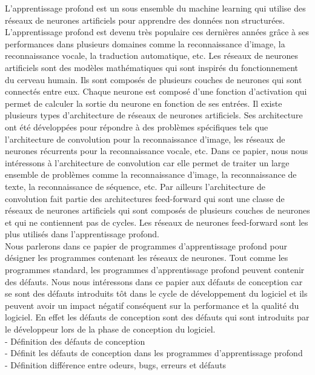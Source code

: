 \label{sec:introduction}

L'apprentissage profond est un sous ensemble du machine learning qui utilise des
réseaux de neurones artificiels pour apprendre des données non structurées.
L'apprentissage profond est devenu très populaire ces dernières années grâce à
ses performances dans plusieurs domaines comme la reconnaissance d'image, la
reconnaissance vocale, la traduction automatique, etc. Les réseaux de neurones
artificiels sont des modèles mathématiques qui sont inspirés du fonctionnement
du cerveau humain. Ils sont composés de plusieurs couches de neurones qui sont
connectés entre eux. Chaque neurone est composé d'une fonction d'activation qui
permet de calculer la sortie du neurone en fonction de ses entrées. Il existe
plusieurs types d'architecture de réseaux de neurones artificiels. Ses
architecture ont été développées pour répondre à des problèmes spécifiques tels
que l'architecture de convolution pour la reconnaissance d'image, les réseaux de
neurones récurrents pour la reconnaissance vocale, etc. Dans ce papier, nous
nous intéressons à l'architecture de convolution car elle permet de traiter un
large ensemble de problèmes comme la reconnaissance d'image, la reconnaissance
de texte, la reconnaissance de séquence, etc. Par ailleurs l'architecture de
convolution fait partie des architectures feed-forward qui sont une classe de
réseaux de neurones artificiels qui sont composés de plusieurs couches de
neurones  et qui ne contiennent pas de cycles. Les réseaux de neurones
feed-forward sont les plus utilisés dans l'apprentissage profond.\\

Nous parlerons dans ce papier de programmes d'apprentissage profond pour
désigner les programmes contenant les réseaux de neurones. Tout comme les programmes
standard, les programmes d'apprentissage profond peuvent contenir des défauts.
Nous nous intéressons dans ce papier aux défauts de conception car se sont des
défauts introduits tôt dans le cycle de développement du logiciel et ils peuvent
avoir un impact négatif conséquent sur la performance et la qualité du logiciel. En effet les défauts de
conception sont des défauts qui sont introduits par le développeur lors de la
phase de  conception du logiciel.\\


- Définition des défauts de conception\\
- Définit les défauts de conception dans les programmes d'apprentissage
profond\\
- Définition différence entre odeurs, bugs, erreurs et défauts\\


